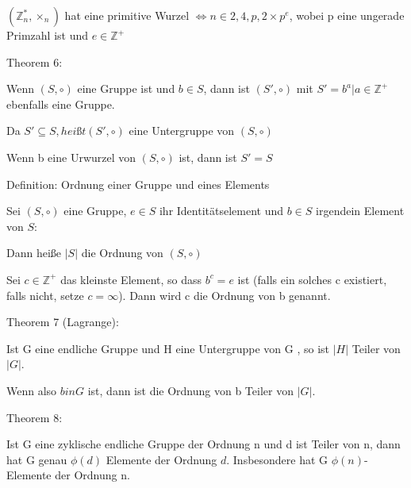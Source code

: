 \documentclass[a4paper]{article}
\begin{document}
\begin{multicols}{3}
\begin{itemize*}
\begin{itemize*}
                  \item $(\mathbb{Z}^*_n, \times_n)$ hat eine primitive Wurzel $\Leftrightarrow n\in{2,4,p,2\times p^e}$, wobei p eine ungerade Primzahl ist und $e\in\mathbb{Z}^+$
            \end{itemize*}
            \item Theorem 6:
            \begin{itemize*}
                  \item Wenn $(S,\circ)$ eine Gruppe ist und $b\in S$, dann ist $(S',\circ)$ mit $S'={b^a| a\in\mathbb{Z}^+}$ ebenfalls eine Gruppe.
                  \item Da $S'\subseteq S, heißt (S',\circ)$ eine Untergruppe von $(S,\circ)$
                  \item Wenn b eine Urwurzel von $(S,\circ)$ ist, dann ist $S'=S$
            \end{itemize*}
            \item Definition: Ordnung einer Gruppe und eines Elements
            \begin{itemize*}
                  \item Sei $(S,\circ)$ eine Gruppe, $e\in S$ ihr Identitätselement und $b\in S$ irgendein Element von $S$:
                  \begin{itemize*}
                        \item Dann heiße $| S|$ die Ordnung von $(S,\circ)$
                        \item Sei $c\in\mathbb{Z}^+$ das kleinste Element, so dass $b^c=e$ ist (falls ein solches c existiert, falls nicht, setze $c=\infty$). Dann wird c die Ordnung von b genannt.
                  \end{itemize*}
            \end{itemize*}
            \item Theorem 7 (Lagrange):
            \begin{itemize*}
                  \item Ist G eine endliche Gruppe und H eine Untergruppe von G , so ist $| H|$ Teiler von $| G|$.
                  \item Wenn also $b in G$ ist, dann ist die Ordnung von b Teiler von $| G|$.
            \end{itemize*}
            \item Theorem 8:
            \begin{itemize*}
                  \item Ist G eine zyklische endliche Gruppe der Ordnung n und d ist Teiler von n, dann hat G genau $\phi(d)$ Elemente der Ordnung $d$. Insbesondere hat G $\phi(n)$-Elemente der Ordnung n.

\end{itemize*}
\end{itemize*}
\end{multicols}
\end{document}
